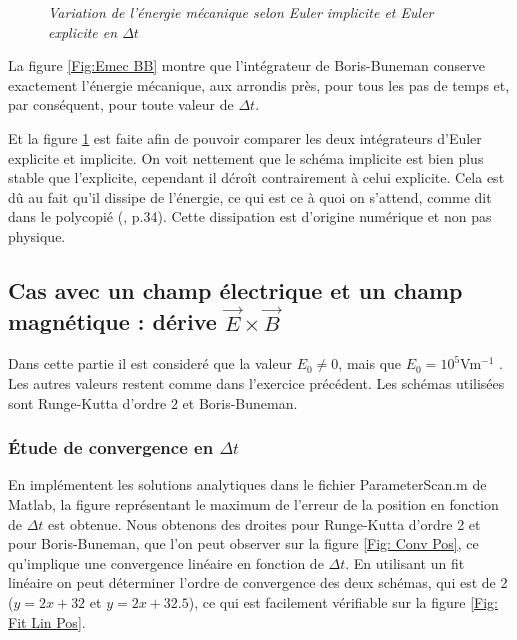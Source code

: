 \documentclass[a4paper,12pt,twoside]{article}
\begin{document}
\begin{figure}[h]
\begin{minipage}[c]{.46\linewidth}
				\caption{\em\label{Fig: Emec EI2} Variation de l'\'energie m\'ecanique selon Euler implicite et Euler explicite  en $\Delta t$}
			\end{minipage}
		\end{figure}
	
	La figure \ref{Fig:Emec BB} montre que l'int\'egrateur de Boris-Buneman conserve exactement l'\'energie m\'ecanique, aux arrondis pr\`es, pour tous les pas de temps et, par cons\'equent, pour toute valeur de $\Delta t$.
	
	Et la figure \ref{Fig: Emec EI2} est faite  afin de pouvoir comparer les deux int\'egrateurs d'Euler explicite et implicite. On voit nettement que le sch\'ema implicite est bien plus stable que l'explicite, cependant il d\'cro\^it contrairement \`a celui explicite. Cela est d\^u au fait qu'il dissipe de l'\'energie, ce qui est ce \`a quoi on s'attend, comme dit dans le polycopi\'e (\cite{NdC}, p.34). Cette dissipation est d'origine num\'erique et non pas physique.

		
	
\subsection{Cas avec un champ \'electrique et un champ magn\'etique : d\'erive $\Vec{E}\times\Vec{B}$}
\noindent Dans cette partie il est consider\'e que la valeur $E_0 \ne 0$, mais que $E_0 = 10^5$Vm$^{-1}$ \cite{Notes}. Les autres valeurs restent comme dans l'exercice pr\'ec\'edent. Les sch\'emas utilis\'ees sont Runge-Kutta d'ordre 2 et Boris-Buneman.
	\subsubsection{\'Etude de convergence en $\Delta t$}
	\noindent En impl\'ementent les solutions analytiques dans le fichier ParameterScan.m de Matlab, la figure repr\'esentant le maximum de l'erreur de la position en fonction de $\Delta t$ est obtenue. Nous obtenons des droites pour Runge-Kutta d'ordre 2 et pour Boris-Buneman, que l'on peut observer sur la figure \ref{Fig: Conv Pos}, ce qu'implique une convergence lin\'eaire en fonction de $\Delta t$. En utilisant un fit lin\'eaire on peut d\'eterminer l'ordre de convergence des deux sch\'emas, qui est de 2 ($y = 2x + 32$ et $y = 2x + 32.5$), ce qui est facilement v\'erifiable sur la figure \ref{Fig: Fit Lin Pos}.
	
\end{document}

